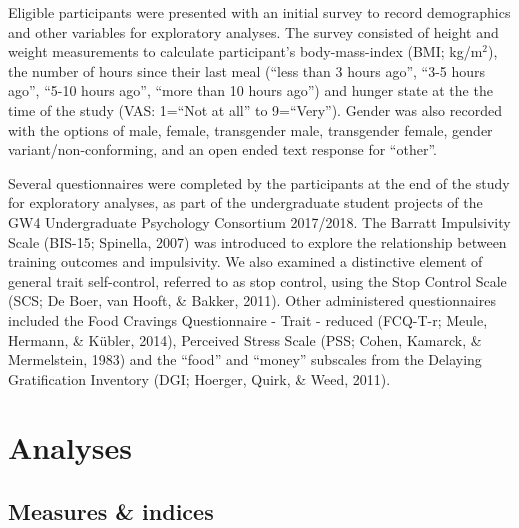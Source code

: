 \documentclass[man,floatsintext]{apa6}
\begin{document}
\par

Eligible participants were presented with an initial survey to record
demographics and other variables for exploratory analyses. The survey
consisted of height and weight measurements to calculate participant's
body-mass-index (BMI; kg/m\(^{2}\)), the number of hours since their
last meal (\enquote{less than 3 hours ago}, \enquote{3-5 hours ago},
\enquote{5-10 hours ago}, \enquote{more than 10 hours ago}) and hunger
state at the the time of the study (VAS: 1=\enquote{Not at all} to
9=\enquote{Very}). Gender was also recorded with the options of male,
female, transgender male, transgender female, gender
variant/non-conforming, and an open ended text response for
\enquote{other}.

\par

Several questionnaires were completed by the participants at the end of
the study for exploratory analyses, as part of the undergraduate student
projects of the GW4 Undergraduate Psychology Consortium 2017/2018. The
Barratt Impulsivity Scale (BIS-15; Spinella, 2007) was introduced to
explore the relationship between training outcomes and impulsivity. We
also examined a distinctive element of general trait self-control,
referred to as stop control, using the Stop Control Scale (SCS; De Boer,
van Hooft, \& Bakker, 2011). Other administered questionnaires included
the Food Cravings Questionnaire - Trait - reduced (FCQ-T-r; Meule,
Hermann, \& Kübler, 2014), Perceived Stress Scale (PSS; Cohen, Kamarck,
\& Mermelstein, 1983) and the \enquote{food} and \enquote{money}
subscales from the Delaying Gratification Inventory (DGI; Hoerger,
Quirk, \& Weed, 2011).

\section{Analyses}\label{analyses}

\subsection{Measures \& indices}\label{measures-indices}

\par
\end{document}
